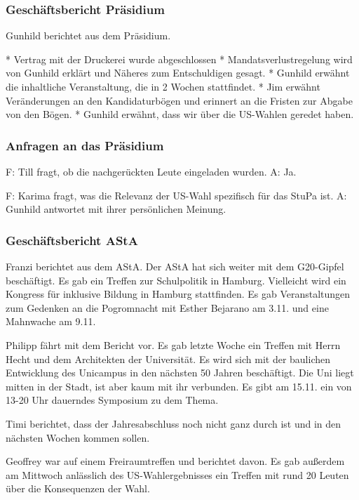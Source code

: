 \documentclass[ngerman,headheight=70pt]{scrartcl}
\begin{document}
    \subsubsection{Geschäftsbericht Präsidium}

    Gunhild berichtet aus dem Präsidium.

    * Vertrag mit der Druckerei wurde abgeschlossen
    * Mandatsverlustregelung wird von Gunhild erklärt und Näheres zum Entschuldigen
      gesagt.
    * Gunhild erwähnt die inhaltliche Veranstaltung, die in 2 Wochen stattfindet.
    * Jim erwähnt Veränderungen an den Kandidaturbögen und erinnert an die Fristen
      zur Abgabe von den Bögen.
    * Gunhild erwähnt, dass wir über die US-Wahlen geredet haben.

    \subsubsection{Anfragen an das Präsidium}

    F: Till fragt, ob die nachgerückten Leute eingeladen wurden.
    A: Ja.

    F: Karima fragt, was die Relevanz der US-Wahl spezifisch für das StuPa
    ist.
    A: Gunhild antwortet mit ihrer persönlichen Meinung.

    \subsubsection{Geschäftsbericht AStA}

    Franzi berichtet aus dem AStA. Der AStA hat sich weiter mit dem G20-Gipfel
    beschäftigt. Es gab ein Treffen zur Schulpolitik in Hamburg. Vielleicht wird
    ein Kongress für inklusive Bildung in Hamburg stattfinden. Es gab Veranstaltungen
    zum Gedenken an die Pogromnacht mit Esther Bejarano am 3.11. und eine Mahnwache
    am 9.11.

    Philipp fährt mit dem Bericht vor. Es gab letzte Woche ein Treffen mit Herrn
    Hecht und dem Architekten der Universität. Es wird sich mit der baulichen
    Entwicklung des Unicampus in den nächsten 50 Jahren beschäftigt. Die Uni liegt
    mitten in der Stadt, ist aber kaum mit ihr verbunden. Es gibt am 15.11. ein
    von 13-20 Uhr dauerndes Symposium zu dem Thema.

    Timi berichtet, dass der Jahresabschluss noch nicht ganz durch ist und in den
    nächsten Wochen kommen sollen.

    Geoffrey war auf einem Freiraumtreffen und berichtet davon. Es gab außerdem
    am Mittwoch anlässlich des US-Wahlergebnisses ein Treffen mit rund 20 Leuten
    über die Konsequenzen der Wahl.
\end{document}
